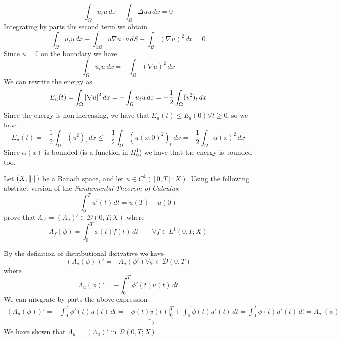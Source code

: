\[
    \int_\Omega u_t u \, dx - \int_\Omega \Delta u u \, dx = 0
\]
Integrating by parts the second term we obtain
\[
    \int_\Omega u_t u \, dx - \int_{\partial\Omega} u \nabla u \cdot \nu \, dS + \int_\Omega (\nabla u)^2 \, dx = 0
\]
Since \(u = 0\) on the boundary we have
\[
    \int_\Omega u_t u \, dx = - \int_\Omega (\nabla u)^2 \, dx 
\]
We can rewrite the energy as
\[
    E_u(t) = \int_\Omega \abs{\nabla u}^2 \, dx = - \int_\Omega u_t u \, dx = - \frac{1}{2} \int_\Omega (u^2)_t \, dx
\]
Since the energy is non-increasing, we have that \(E_u(t) \leq E_u(0) \forall t \geq 0\), so we have 
\[
    E_u(t) = - \frac{1}{2} \int_\Omega (u^2)_t \, dx \leq - \frac{1}{2} \int_\Omega (u(x, 0)^2)_t \, dx = - \frac{1}{2} \int_\Omega \alpha(x)^2 \, dx
\]
Since \(\alpha(x)\) is bounded (is a function in \(H^1_0\)) we have that the energy is bounded too.

\newpage
\begin{exercise}
    Let \((X, \norm{\cdot})\) be a Banach space, and let \(u \in C^1([0, T]; X)\). Using the following abstract version of the \textit{Fundamental Theorem of Calculus}:
    \[
        \int_0^T u'(t) \, dt = u(T) - u(0)
    \]
    prove that \(\Lambda_{u'} = (\Lambda_u)' \in \mathcal{D}(0, T; X)\) where 
    \[
        \Lambda_f(\phi) = \int_0^T \phi(t) f(t) \, dt \qquad \forall f \in L^1(0, T; X)
    \]
\end{exercise}

By the definition of distributional derivative we have
\[
    (\Lambda_u(\phi))' = - \Lambda_u(\phi') \forall \phi \in \mathcal{D}(0, T)
\]
where 
\[
    \Lambda_u(\phi)' = - \int_0^T \phi'(t) u(t) \, dt
\]
We can integrate by parts the above expression
\[
    \begin{split}
        (\Lambda_u(\phi))' = - \int_0^T \phi'(t) u(t) \, dt =  \underbrace{\left. - \phi(t) u(t) \right|_0^T}_{=0} + \int_0^T \phi(t) u'(t) \, dt = \int_0^T \phi(t) u'(t) \, dt = \Lambda_{u'}(\phi)
    \end{split}
\]
We have shown that \(\Lambda_{u'} = (\Lambda_u)'\) in \(\mathcal{D}(0, T; X)\).

\newpage
